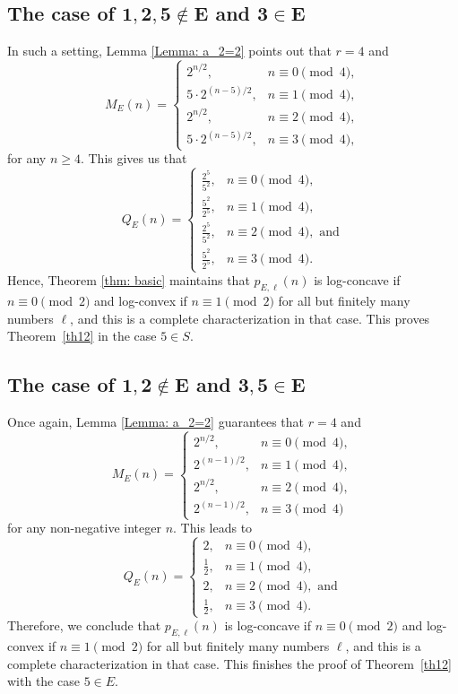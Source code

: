 \documentclass[12pt]{amsart}
\theoremstyle{definition}
\theoremstyle{remark}
\numberwithin{theorem}{section} \numberwithin{equation}{section}
\begin{document}
\subsection{The case of $\mathbf{1,2,5 \not\in E}$ and $\mathbf{3\in E}$}
\label{subsection42}
In such a setting, Lemma \ref{Lemma: a_2=2} points out that $r=4$ and
\[
M_{E}\left( n\right)
=\left\{
\begin{array}{ll}
2^{n/2}, & n\equiv 0\pmod{4}, \\
5 \cdot 2^{(n-5)/2}, & n\equiv 1\pmod{4}, \\
2^{n/2}, & n\equiv 2\pmod{4}, \\
5 \cdot 2^{(n-5)/2}, & n\equiv 3\pmod{4},
\end{array}
\right.
\]
for any $n\geq4$. This gives us that 
\begin{equation*}
Q_{E}\left( n\right) =\left\{
\begin{array}{ll}
\frac{2^5}{5^2}, & n\equiv 0\pmod{4}, \\
\frac{5^2}{2^5}, & n\equiv 1\pmod{4}, \\
\frac{2^5}{5^2}, & n\equiv 2\pmod{4}, \text{ and}\\
\frac{5^2}{2^5}, & n\equiv 3\pmod{4}.
\end{array}
\right.
\end{equation*}
Hence, Theorem \ref{thm: basic} maintains that $p_{E,\ell }(n)$ is log-concave if $n\equiv0\pmod{2}$ and log-convex if $n\equiv1\pmod{2}$ for all but finitely many numbers $\ell$, and this is a complete characterization in that case.
This proves Theorem~\ref{th12} in
the case $5\in S$.

\subsection{The case of $\mathbf{1,2 \not\in E}$ and $\mathbf{3,5 \in E}$}
\label{subsection43}
Once again, Lemma \ref{Lemma: a_2=2} guarantees that $r=4$ and
\[
M_{E}\left( n\right) =\left\{
\begin{array}{ll}
2^{n/2}, & n\equiv 0\pmod{4}, \\
2^{(n-1)/2}, & n\equiv 1\pmod{4}, \\
2^{n/2}, & n\equiv 2\pmod{4}, \\
2^{(n-1)/2}, & n\equiv 3\pmod{4}
\end{array}
\right.
\]
for any non-negative integer $n$. This leads to 
\begin{equation*}
Q_{E}\left( n\right) =\left\{
\begin{array}{ll}
2, & n\equiv 0\pmod{4}, \\
\frac{1}{2}, & n\equiv 1\pmod{4}, \\
2, & n\equiv 2\pmod{4}, \text{ and} \\
\frac{1}{2}, & n\equiv 3\pmod{4}.
\end{array}
\right.
\end{equation*}
Therefore, we conclude that $p_{E,\ell }(n)$ is log-concave if $n\equiv0\pmod{2}$ and log-convex if $n\equiv1\pmod{2}$ for all but finitely many numbers $\ell$, and this is a complete characterization in that case.
This finishes the proof of
Theorem~\ref{th12} with the
case $5\in E$. 
\end{document}
